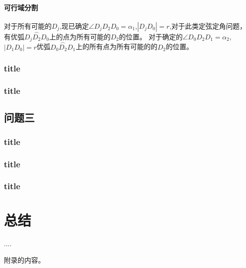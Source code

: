 \documentclass{cumcmthesis}
\begin{document}
			\paragraph{可行域分割}
			对于所有可能的$D_j$,现已确定$\angle D_jD_2D_0 = \alpha_1$,$|D_jD_0|= r$,对于此类定弦定角问题，有优弧$\overset{\frown}{D_jD_2D_0}$上的点为所有可能的$D_2$的位置。
			对于确定的$\angle D_0D_2D_1 = \alpha_2$,$|D_1D_0|= r$优弧$\overset{\frown}{D_0D_2D_1}$上的所有点为所有可能的的$D_2$的位置。
			\subsubsection{title}
			\subsubsection{title}
		\subsection{问题三}
			\subsubsection{title}
			\subsubsection{title}
			\subsubsection{title}
	\section{总结}
	\begin{thebibliography}{9}%
		 ....
	\end{thebibliography}
	\begin{appendices}
		附录的内容。
	\end{appendices}
\end{document}
